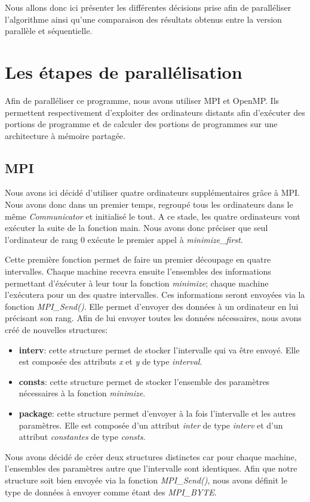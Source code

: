 \documentclass[a4paper,10pt]{article}
\begin{document}
Nous allons donc ici présenter les différentes décisions prise afin de paralléliser l'algorithme ainsi qu'une comparaison des résultats obtenus entre la version parallèle et séquentielle.

\newpage
\section{Les étapes de parallélisation}

Afin de paralléliser ce programme, nous avons utiliser MPI et OpenMP. Ils permettent respectivement d'exploiter des ordinateurs distants afin d'exécuter des portions de programme et de calculer des portions de programmes sur une architecture à mémoire partagée.

\subsection{MPI}
Nous avons ici décidé d'utiliser quatre ordinateurs supplémentaires grâce à MPI. Nous avons donc dans un premier temps, regroupé tous les ordinateurs dans le même \emph{Communicator} et initialisé le tout. A ce stade, les quatre ordinateurs vont exécuter la suite de la fonction main. Nous avons donc préciser que seul l'ordinateur de rang 0 exécute le premier appel à \emph{minimize\_first}.

Cette première fonction permet de faire un premier découpage en quatre intervalles. Chaque machine recevra ensuite l'ensembles des informations permettant d'éxécuter à leur tour la fonction \emph{minimize}; chaque machine l'exécutera pour un des quatre intervalles. Ces informations seront envoyées via la fonction \emph{MPI\_Send()}. Elle permet d'envoyer des données à un ordinateur en lui précisant son rang. Afin de lui envoyer toutes les données nécessaires, nous avons créé de nouvelles structures:
\begin{itemize}
\item \textbf{interv}: cette structure permet de stocker l'intervalle qui va être envoyé. Elle est composée des attributs \emph{x} et \emph{y} de type \emph{interval}.
\item \textbf{consts}: cette structure permet de stocker l'ensemble des paramètres nécessaires à la fonction \emph{minimize}.
\item \textbf{package}: cette structure permet d'envoyer à la fois l'intervalle et les autres paramètres. Elle est composée d'un attribut \emph{inter} de type \emph{interv} et d'un attribut \emph{constantes} de type \emph{consts}.
\end{itemize}
Nous avons décidé de créer deux structures distinctes car pour chaque machine, l'ensembles des paramètres autre que l'intervalle sont identiques.
Afin que notre structure soit bien envoyée via la fonction \emph{MPI\_Send()}, nous avons définit le type de données à envoyer comme étant des \emph{MPI\_BYTE}.
\end{document}
